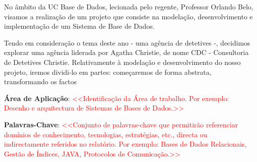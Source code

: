 \documentclass[a4paper,12pt]{scrreprt}
\begin{document}



\makecover



%
%



\renewenvironment{abstract}
 {\par\noindent\textbf{\Large\abstractname}\par\bigskip}
 {}

\begin{flushleft}
\begin{abstract}
    No âmbito da UC Base de Dados, lecionada pelo regente, Professor Orlando Belo, visamos a
    realização de um projeto que consiste na modelação, desenvolvimento e implementação de um
    Sistema de Base de Dados.
    \par Tendo em consideração o tema deste ano - uma agência de detetives -, decidimos explorar
    uma agência liderada por Agatha Christie, de nome CDC - Consultoria de Detetives Christie.
    Relativamente à modelação e desenvolvimento do nosso projeto, iremos dividi-lo em partes:
    começaremos de forma abstrata, transformando os factos
    \par \textbf{Área de Aplicação}: \textcolor{red}{
        <<Identificação da Área de trabalho. Por exemplo: Desenho e arquitectura de Sistemas de Bases de Dados.>>
    }
    \par \textbf{Palavras-Chave}: \textcolor{red}{
        <<Conjunto de palavras-chave que permitirão referenciar domínios de conhecimento, tecnologias, estratégias, etc., directa ou indirectamente referidos no relatório. Por exemplo: Bases de Dados Relacionais, Gestão de Índices, JAVA, Protocolos de Comunicação.>>
    }
\end{abstract}
\end{flushleft}
\end{document}
